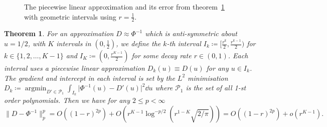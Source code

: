 \documentclass[9pt,a4paper,english]{extarticle}
\DeclareMathOperator*{\argmin}{argmin} %
\newtheorem{theorem}{Theorem}[section]
\begin{document}
\begin{figure}[htb]
\centering

\hfil
{}\hfil
{}\hfil

\caption{The piecewise linear approximation and its error from theorem~\ref{thm:piecewise_linear_approximation_error} with geometric intervals using $ r = \tfrac{1}{2} $.}
\label{fig:piecewise_linear_approximation}
\end{figure}

\begin{theorem}
\label{thm:piecewise_linear_approximation_error}
For an approximation $ D \approx \Phi^{-1}$ which is anti-symmetric about $ u=1/2$, with $ K $ intervals in $ (0, \tfrac{1}{2}) $, we define the $ k $-th interval $ I_k \coloneqq [\tfrac{r^k}{2}, \tfrac{r^{k-1}}{2})$ for $ k \in \{1,2,\ldots, K-1\} $ and $ I_K \coloneqq (0, \tfrac{r^{K-1}}{2}) $ for some decay rate $ r \in(0,1) $. Each interval uses a piecewise linear approximation $ D_k(u) \equiv D(u) $ for any $ u \in I_k $. The gradient and intercept in each interval is set by the $ L^2 $ minimisation $ D_k \coloneqq \argmin_{D' \in \mathcal{P}_1} \int_{I_k}\lvert\Phi^{-1}(u) - D'(u)\rvert^2 \dd{u} $ where $ \mathcal{P}_1 $  is the set of all 1-st order polynomials. Then we have for any $ 2 \leq p < \infty  $
\begin{equation*}
\lVert D - \Phi^{-1}\rVert_p^p 
= O((1-r)^{2p}) +
O(r^{K-1} {\log}^{-p/2}(r^{1-K}\sqrt{2/\pi}))  = O((1-r)^{2p}) +
o(r^{K-1}).
\end{equation*}
\end{theorem}
\end{document}
